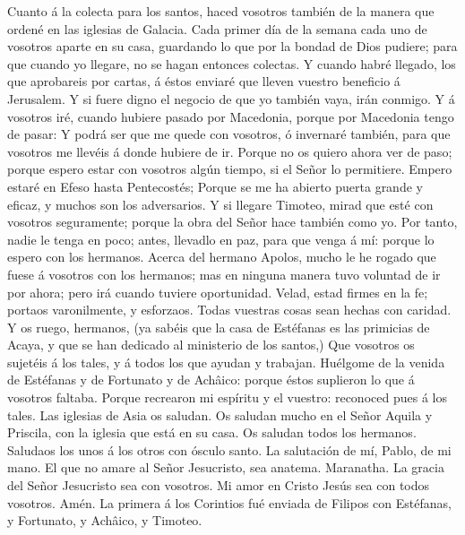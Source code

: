  Cuanto á la colecta para los santos, haced vosotros también
de la manera que ordené en las iglesias de Galacia.  Cada
primer día de la semana cada uno de vosotros aparte en su casa,
guardando lo que por la bondad de Dios pudiere; para que cuando yo
llegare, no se hagan entonces colectas.  Y cuando habré
llegado, los que aprobareis por cartas, á éstos enviaré que lleven
vuestro beneficio á Jerusalem.  Y si fuere digno el negocio
de que yo también vaya, irán conmigo.  Y á vosotros iré,
cuando hubiere pasado por Macedonia, porque por Macedonia tengo de
pasar:  Y podrá ser que me quede con vosotros, ó invernaré
también, para que vosotros me llevéis á donde hubiere de ir.
 Porque no os quiero ahora ver de paso; porque espero estar
con vosotros algún tiempo, si el Señor lo permitiere. 
Empero estaré en Efeso hasta Pentecostés;  Porque se me ha
abierto puerta grande y eficaz, y muchos son los adversarios.
 Y si llegare Timoteo, mirad que esté con vosotros
seguramente; porque la obra del Señor hace también como yo.
 Por tanto, nadie le tenga en poco; antes, llevadlo en paz,
para que venga á mí: porque lo espero con los hermanos. 
Acerca del hermano Apolos, mucho le he rogado que fuese á vosotros con
los hermanos; mas en ninguna manera tuvo voluntad de ir por ahora; pero
irá cuando tuviere oportunidad.  Velad, estad firmes en la
fe; portaos varonilmente, y esforzaos.  Todas vuestras
cosas sean hechas con caridad.  Y os ruego, hermanos, (ya
sabéis que la casa de Estéfanas es las primicias de Acaya, y que se han
dedicado al ministerio de los santos,)  Que vosotros os
sujetéis á los tales, y á todos los que ayudan y trabajan. 
Huélgome de la venida de Estéfanas y de Fortunato y de Achâico: porque
éstos suplieron lo que á vosotros faltaba.  Porque
recrearon mi espíritu y el vuestro: reconoced pues á los tales.
 Las iglesias de Asia os saludan. Os saludan mucho en el
Señor Aquila y Priscila, con la iglesia que está en su casa.
 Os saludan todos los hermanos. Saludaos los unos á los
otros con ósculo santo.  La salutación de mí, Pablo, de mi
mano.  El que no amare al Señor Jesucristo, sea anatema.
Maranatha.  La gracia del Señor Jesucristo sea con
vosotros.  Mi amor en Cristo Jesús sea con todos vosotros.
Amén. La primera á los Corintios fué enviada de Filipos con Estéfanas, y
Fortunato, y Achâico, y Timoteo.
